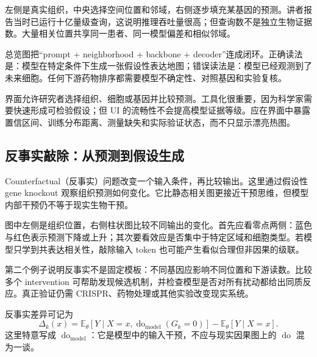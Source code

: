 
左侧是真实组织，中央选择空间位置和邻域，右侧逐步填充某基因的预测。讲者报告当时已运行十亿量级查询，这说明推理吞吐量很高；但查询数不是独立生物证据数。大量相关位置共享同一患者、同一模型偏差和相似邻域。


总览图把“prompt + neighborhood + backbone + decoder”连成闭环。正确读法是：模型在特定条件下生成一张假设性表达地图；错误读法是：模型已经观测到了未来细胞。任何下游药物排序都需要模型不确定性、对照基因和实验复核。


界面允许研究者选择组织、细胞或基因并比较预测。工具化很重要，因为科学家需要快速形成可检验假设；但 UI 的流畅性不会提高模型证据等级。应在界面中暴露置信区间、训练分布距离、测量缺失和实际验证状态，而不只显示漂亮热图。

\subsection{反事实敲除：从预测到假设生成}

Counterfactual（反事实）问题改变一个输入条件，再比较输出。这里通过假设性 gene knockout 观察组织预测如何变化。它比静态相关图更接近干预思维，但模型内部干预仍不等于现实生物干预。


图中左侧是组织位置，右侧柱状图比较不同输出的变化。首先应看零点两侧：蓝色与红色表示预测下降或上升；其次要看效应是否集中于特定区域和细胞类型。若模型只学到共表达相关性，敲除输入 token 也可能产生看似合理但非因果的级联。


第二个例子说明反事实不是固定模板：不同基因应影响不同位置和下游读数。比较多个 intervention 可帮助发现候选机制，并检查模型是否对所有扰动都给出同质反应。真正验证仍需 CRISPR、药物处理或其他实验改变现实系统。

反事实差异可记为
\[
\Delta_k(x)=
\mathbb{E}_\theta[Y\mid X=x,\operatorname{do}_{\text{model}}(G_k=0)]
-\mathbb{E}_\theta[Y\mid X=x].
\]
这里特意写成 $\operatorname{do}_{\text{model}}$：它是模型中的输入干预，不应与现实因果图上的 $\operatorname{do}$ 混为一谈。

